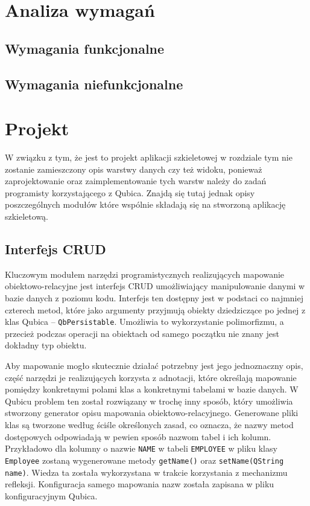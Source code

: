 \documentclass[12pt]{report}
\begin{document}
\section{Analiza wymagań}

\subsection{Wymagania funkcjonalne}

\subsection{Wymagania niefunkcjonalne}

\section{Projekt} %

W związku z tym, że jest to projekt aplikacji szkieletowej w rozdziale tym nie zostanie zamieszczony opis warstwy danych czy też widoku, ponieważ zaprojektowanie oraz
zaimplementowanie tych warstw należy do zadań programisty ko\-rzy\-sta\-ją\-cego z Qubica. Znajdą się tutaj jednak opisy poszczególnych modułów które wspólnie składają się
na stworzoną aplikację szkieletową.

\subsection{Interfejs CRUD}

Kluczowym modułem narzędzi programistycznych realizujących mapowanie obiekt\-owo-relacyjne jest interfejs CRUD umożliwiający manipulowanie danymi w bazie danych z 
poziomu kodu. Interfejs ten dostępny jest w podstaci co najmniej czterech metod, które jako argumenty przyjmują obiekty dziedziczące po jednej z klas Qubica -- 
{\tt QbPersistable}. Umożliwia to wykorzystanie polimorfizmu, a przecież podczas operacji na obiektach od samego początku nie znany jest dokładny typ obiektu.

Aby mapowanie mogło skutecznie działać potrzebny jest jego jednoznaczny opis, część narzędzi je realizujących korzysta z adnotacji, które określają mapowanie pomiędzy
konkretnymi polami klas a konkretnymi tabelami w bazie danych. W Qubicu problem ten został rozwiązany w trochę inny sposób, który umożliwia stworzony generator opisu
mapowania obiektowo-relacyjnego. Generowane pliki klas są tworzone według ściśle określonych zasad, co oznacza, że nazwy metod dostępowych odpowiadają w pewien
sposób nazwom tabel i ich kolumn. Przykładowo dla kolumny o nazwie {\tt NAME} w tabeli {\tt EMPLOYEE} w pliku klasy {\tt Employee} zostaną wygenerowane metody 
{\tt getName()} oraz {\tt setName(QString name)}. Wie\-dza ta została wykorzystana w trakcie korzystania z mechanizmu refleksji. Konfiguracja samego mapowania nazw
została zapisana w pliku konfiguracyjnym Qubica.
\end{document}
